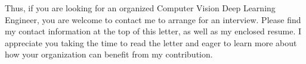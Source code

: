 Thus, if you are looking for an organized Computer Vision Deep Learning Engineer, you are welcome to contact me to arrange for an interview. Please find my contact information at the top of this letter, as well as my enclosed resume. I appreciate you taking the time to read the letter and eager to learn more about how your organization can benefit from my contribution.